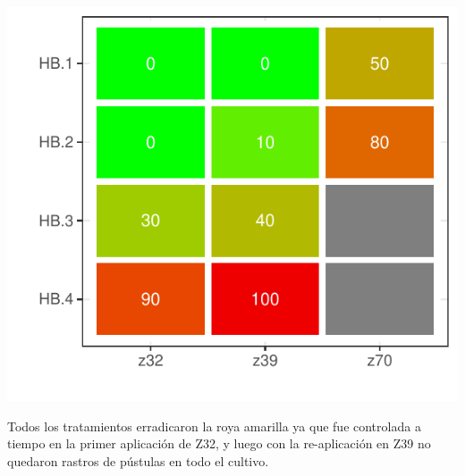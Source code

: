 \documentclass[
  letterpaper,
  DIV=11,
  numbers=noendperiod]{scrreprt}
\begin{document}
\includegraphics{./foliares_files/figure-pdf/unnamed-chunk-38-1.pdf}

Todos los tratamientos erradicaron la roya amarilla ya que fue
controlada a tiempo en la primer aplicación de Z32, y luego con la
re-aplicación en Z39 no quedaron rastros de pústulas en todo el cultivo.

 
  \providecommand{\huxb}[2]{\arrayrulecolor[RGB]{#1}\global\arrayrulewidth=#2pt}
  \providecommand{\huxvb}[2]{\color[RGB]{#1}\vrule width #2pt}
  \providecommand{\huxtpad}[1]{\rule{0pt}{#1}}
  \providecommand{\huxbpad}[1]{\rule[-#1]{0pt}{#1}}
\end{document}
